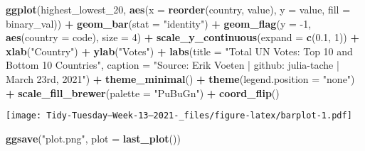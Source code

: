 \documentclass[
]{article}
\newenvironment{Shaded}{\begin{snugshade}}{\end{snugshade}}
\newcommand{\DataTypeTok}[1]{\textcolor[rgb]{0.13,0.29,0.53}{#1}}
\newcommand{\DecValTok}[1]{\textcolor[rgb]{0.00,0.00,0.81}{#1}}
\newcommand{\FloatTok}[1]{\textcolor[rgb]{0.00,0.00,0.81}{#1}}
\newcommand{\KeywordTok}[1]{\textcolor[rgb]{0.13,0.29,0.53}{\textbf{#1}}}
\newcommand{\NormalTok}[1]{#1}
\newcommand{\OperatorTok}[1]{\textcolor[rgb]{0.81,0.36,0.00}{\textbf{#1}}}
\newcommand{\StringTok}[1]{\textcolor[rgb]{0.31,0.60,0.02}{#1}}
\begin{document}
\begin{Shaded}
\begin{Highlighting}[]
\KeywordTok{ggplot}\NormalTok{(highest\_lowest\_}\DecValTok{20}\NormalTok{, }\KeywordTok{aes}\NormalTok{(}\DataTypeTok{x =} \KeywordTok{reorder}\NormalTok{(country, value), }\DataTypeTok{y =}\NormalTok{ value, }\DataTypeTok{fill =}\NormalTok{ binary\_val)) }\OperatorTok{+}
\StringTok{  }\KeywordTok{geom\_bar}\NormalTok{(}\DataTypeTok{stat =} \StringTok{"identity"}\NormalTok{) }\OperatorTok{+}\StringTok{ }
\StringTok{  }\KeywordTok{geom\_flag}\NormalTok{(}\DataTypeTok{y =} \DecValTok{{-}1}\NormalTok{, }\KeywordTok{aes}\NormalTok{(}\DataTypeTok{country =}\NormalTok{ code), }\DataTypeTok{size =} \DecValTok{4}\NormalTok{) }\OperatorTok{+}\StringTok{ }
\StringTok{  }\KeywordTok{scale\_y\_continuous}\NormalTok{(}\DataTypeTok{expand =} \KeywordTok{c}\NormalTok{(}\FloatTok{0.1}\NormalTok{, }\DecValTok{1}\NormalTok{)) }\OperatorTok{+}
\StringTok{  }\KeywordTok{xlab}\NormalTok{(}\StringTok{"Country"}\NormalTok{) }\OperatorTok{+}
\StringTok{  }\KeywordTok{ylab}\NormalTok{(}\StringTok{"Votes"}\NormalTok{) }\OperatorTok{+}
\StringTok{  }\KeywordTok{labs}\NormalTok{(}\DataTypeTok{title =} \StringTok{"Total UN Votes: Top 10 and Bottom 10 Countries"}\NormalTok{,}
       \DataTypeTok{caption =} \StringTok{"Source: Erik Voeten | github: julia{-}tache | March 23rd, 2021"}\NormalTok{) }\OperatorTok{+}\StringTok{ }
\StringTok{  }\KeywordTok{theme\_minimal}\NormalTok{() }\OperatorTok{+}
\StringTok{  }\KeywordTok{theme}\NormalTok{(}\DataTypeTok{legend.position =} \StringTok{"none"}\NormalTok{) }\OperatorTok{+}
\StringTok{  }\KeywordTok{scale\_fill\_brewer}\NormalTok{(}\DataTypeTok{palette =} \StringTok{"PuBuGn"}\NormalTok{) }\OperatorTok{+}\StringTok{ }
\StringTok{  }\KeywordTok{coord\_flip}\NormalTok{()}
\end{Highlighting}
\end{Shaded}

\texttt{[image: Tidy-Tuesday---Week-13--2021-\_files/figure-latex/barplot-1.pdf]}

\begin{Shaded}
\begin{Highlighting}[]
\KeywordTok{ggsave}\NormalTok{(}\StringTok{"plot.png"}\NormalTok{, }\DataTypeTok{plot =} \KeywordTok{last\_plot}\NormalTok{())}
\end{Highlighting}
\end{Shaded}
\end{document}
